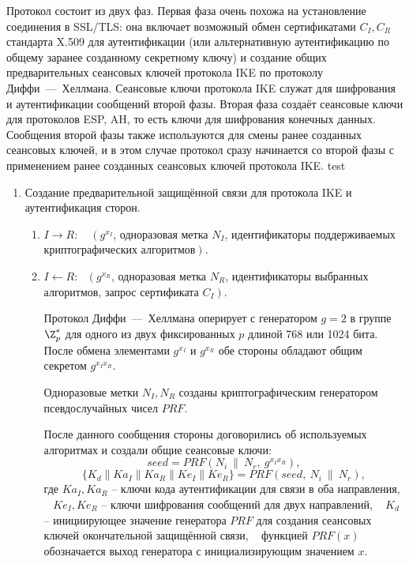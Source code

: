 Протокол состоит из двух фаз. Первая фаза очень похожа на установление соединения в SSL/TLS: она включает возможный обмен сертификатами $C_I, C_R$ стандарта X.509 для аутентификации (или альтернативную аутентификацию по общему заранее созданному секретному ключу) и создание общих предварительных сеансовых ключей протокола IKE по протоколу Диффи~---~Хеллмана. Сеансовые ключи протокола IKE служат для шифрования и аутентификации сообщений второй фазы. Вторая фаза создаёт сеансовые ключи для протоколов ESP, AH, то есть ключи для шифрования конечных данных. Сообщения второй фазы также используются для смены ранее созданных сеансовых ключей, и в этом случае протокол сразу начинается со второй фазы с применением ранее созданных сеансовых ключей протокола IKE.
test
\begin{enumerate}
    \item Создание предварительной защищённой связи для протокола IKE и аутентификация сторон.
        \begin{enumerate}
            \item $I \rightarrow R$: ~ $\left(g^{x_I}\right.$, одноразовая метка $N_I$, идентификаторы поддерживаемых криптографических алгоритмов$\left.\right)$.

            \item $I \leftarrow R$: ~$\left(g^{x_R}\right.$, одноразовая метка $N_R$, идентификаторы выбранных алгоритмов, запрос сертификата $C_I\left.\right)$.

                Протокол Диффи~---~Хеллмана оперирует с генератором $g=2$ в группе $\Z_p^*$ для одного из двух фиксированных $p$ длиной 768 или 1024 бита. После обмена элементами $g^{x_I}$ и $g^{x_R}$ обе стороны обладают общим секретом $g^{x_I x_R}$.

                Одноразовые метки $N_I, N_R$ созданы криптографическим генератором псевдослучайных чисел $PRF$.

                После данного сообщения стороны договорились об используемых алгоритмах и создали общие сеансовые ключи:
                    \[ seed = PRF(N_i ~\|~ N_r, ~g^{x_I x_R}), \]
                    \[ \{ K_d \| Ka_I \| Ka_R \| Ke_I \| Ke_R
                        \} = PRF(seed, ~ N_i ~\|~ N_r), \]
                где $Ka_I, Ka_R$ -- ключи кода аутентификации для связи в оба направления, ~ $Ke_I, Ke_R$ -- ключи шифрования сообщений для двух направлений, ~ $K_d$ -- инициирующее значение генератора $PRF$ для создания сеансовых ключей окончательной защищённой связи, ~ функцией $PRF(x)$ обозначается выход генератора с инициализирующим значением $x$.


\end{enumerate}
\end{enumerate}
